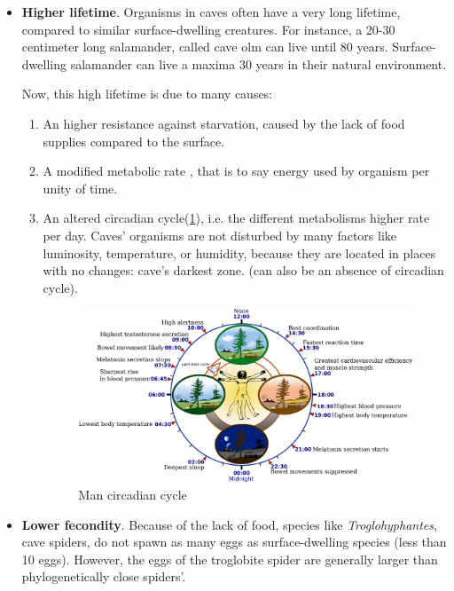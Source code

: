\documentclass[draft, final]{report}
\begin{document}
\begin{itemize}
  \item \textbf{Higher lifetime}. Organisms in caves often have a very long lifetime, compared to similar surface-dwelling creatures. For instance, a 20-30 centimeter long salamander, called cave olm can live until 80 years. Surface-dwelling salamander can live a maxima 30 years in their natural environment.\par
  Now, this high lifetime is due to many causes:
  \begin{enumerate}
    \item An higher resistance against starvation, caused by the lack of food supplies compared to the surface.
    \item A modified metabolic rate , that is to say energy used by organism per unity of time.
    \item An altered circadian cycle(\ref{cyrcadiancycle1}), i.e. the different metabolisms higher rate per day. Caves’ organisms are not disturbed by many factors like luminosity, temperature, or humidity, because they are located in places with no changes: cave’s darkest zone. (can also be an absence of circadian cycle).
      \begin{figure}[!ht]
        \centering
        \includegraphics[scale = 0.4]{LateX/Images/CircadianCycle.png}
        \caption{Man circadian cycle \cite{circadiancycle}\label{cyrcadiancycle1}}
      \end{figure}
  \end{enumerate}
  \newpage
  \item \textbf{Lower fecondity}. Because of the lack of food, species like \emph{Troglohyphantes}, cave spiders, do not spawn as many eggs as surface-dwelling species (less than 10 eggs). However, the eggs of the troglobite spider are generally larger than phylogenetically close spiders'.
\end{itemize}
\end{document}
